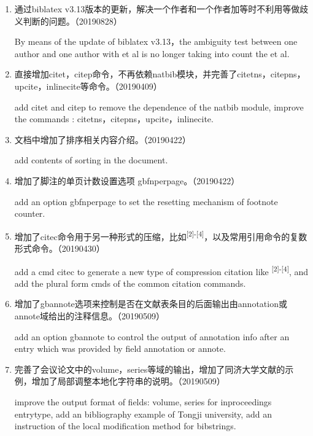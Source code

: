 \begin{enumerate}

\item 通过biblatex v3.13版本的更新，解决一个作者和一个作者加等时不利用等做歧义判断的问题。（20190828）

By means of the update of biblatex v3.13，the ambiguity test between one author and one author with et al is no longer taking into count the et al.

\item 直接增加citet，citep命令，不再依赖natbib模块，并完善了citetns，citepns，upcite，inlinecite等命令。（20190409）

add citet and citep to remove the dependence of the natbib module, improve the commands : citetns，citepns，upcite，inlinecite.


\item 文档中增加了排序相关内容介绍。（20190422）

add contents of sorting in the document.


\item 增加了脚注的单页计数设置选项 gbfnperpage。（20190422）

add an option gbfnperpage to set the resetting mechanism of footnote counter.

\item 增加了citec命令用于另一种形式的压缩，比如\textsuperscript{[2]-[4]}，以及常用引用命令的复数形式命令。（20190430）

add a cmd citec to generate a new type of compression citation like \textsuperscript{[2]-[4]}, and add the plural form cmds of the common citation commands.

\item 增加了gbannote选项来控制是否在文献表条目的后面输出由annotation或annote域给出的注释信息。（20190509）

add an option gbannote to control the output of annotation info after an entry which was provided by field annotation or annote.

\item 完善了会议论文中的volume，series等域的输出，增加了同济大学文献的示例，增加了局部调整本地化字符串的说明。（20190509）

improve the output format of fields: volume, series for inproceedings entrytype, add an bibliography example of Tongji university, add an instruction of the local modification method for bibstrings.

\end{enumerate}


